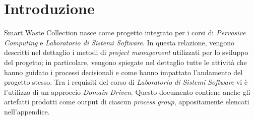 \section*{Introduzione}
\label{sec:introduction}

Smart Waste Collection nasce come progetto integrato per i corsi di \textit{Pervasive Computing} e \textit{Laboratorio di
Sistemi Software}. In questa relazione, vengono descritti nel dettaglio i metodi di \textit{project management} utilizzati
per lo sviluppo del progetto; in particolare, vengono spiegate nel dettaglio tutte le attività che hanno guidato i
processi decisionali e come hanno impattato l'andamento del progetto stesso. Tra i requisiti del corso di \textit{Laboratorio
di Sistemi Software} vi è l'utilizzo di un approccio \textit{Domain Driven}. Questo documento contiene anche gli artefatti
prodotti come output di ciascun \textit{process group}, appositamente elencati nell'appendice.